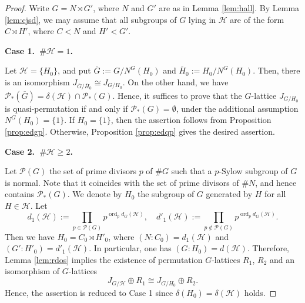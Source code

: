 \documentclass[12pt]{amsart}
\theoremstyle{plain}
\theoremstyle{definition}
\numberwithin{thm}{section}
\numberwithin{equation}{section}
\newcommand{\cH}{\mathcal{H}}
\DeclareMathOperator{\ord}{ord}
\begin{document}
\begin{proof}
Write $G=N\rtimes G'$, where $N$ and $G'$ are as in Lemma \ref{lem:hall}. By Lemma \ref{lem:cjsd}, we may assume that all subgroups of $G$ lying in $\cH$ are of the form $C\rtimes H'$, where $C<N$ and $H'<G'$. 

\textbf{Case 1.~$\#\cH=1$. }

Let $\cH=\{H_{0}\}$, and put $\overline{G}:=G/N^{G}(H_{0})$ and $\overline{H}_{0}:=H_{0}/N^{G}(H_{0})$. Then, there is an isomorphism $J_{\overline{G}/\overline{H}_{0}}\cong J_{G/H_{0}}$. On the other hand, we have $\mathscr{P}_{*}(\overline{G})=\delta(\cH)\cap \mathscr{P}_{*}(G)$. Hence, it suffices to prove that the $G$-lattice $J_{G/H_{0}}$ is quasi-permutation if and only if $\mathscr{P}_{*}(G)=\emptyset$, under the additional assumption $N^{G}(H_{0})=\{1\}$. If $H_{0}=\{1\}$, then the assertion follows from Proposition \ref{prop:edgp}. Otherwise, Proposition \ref{prop:edqp} gives the desired assertion. 

\textbf{Case 2.~$\#\cH \geq 2$. }

Let $\mathscr{P}(G)$ the set of prime divisors $p$ of $\#G$ such that a $p$-Sylow subgroup of $G$ is normal. Note that it coincides with the set of prime divisors of $\#N$, and hence contains $\mathscr{P}_{*}(G)$. We denote by $H_{0}$ the subgroup of $G$ generated by $H$ for all $H\in \cH$. Let 
\begin{equation*}
d_{1}(\cH):=\prod_{p\in \mathscr{P}(G)}p^{\ord_{p}d_{G}(\cH)},\quad 
d'_{1}(\cH):=\prod_{p\notin \mathscr{P}(G)}p^{\ord_{p}d_{G}(\cH)}. 
\end{equation*}
Then we have $H_{0}=C_{0}\rtimes H'_{0}$, where $(N:C_{0})=d_{1}(\cH)$ and $(G':H'_{0})=d'_{1}(\cH)$. In particular, one has $(G:H_{0})=d(\cH)$. Therefore, Lemma \ref{lem:rdos} implies the existence of permutation $G$-lattices $R_{1}$, $R_{2}$ and an isomorphism of $G$-lattices
\begin{equation*}
J_{G/\cH}\oplus R_{1}\cong J_{G/H_{0}}\oplus R_{2}. 
\end{equation*}
Hence, the assertion is reduced to Case 1 since $\delta(H_{0})=\delta(\cH)$ holds. 
\end{proof}
\end{document}

